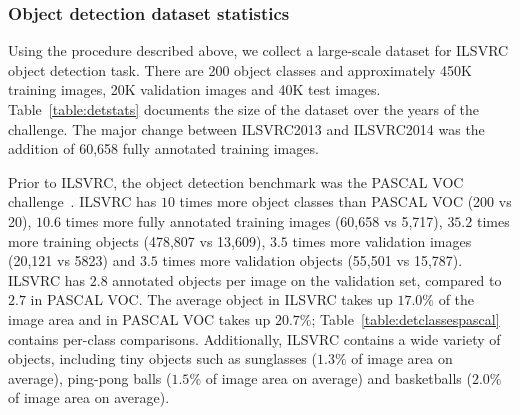 \begin{table}
\begin{algorithm}[t]
 \caption{The algorithm for complete multi-class annotation. This is a special case of the algorithm described in~\citep{Deng14}.
A hierarchy of questions  $\mathcal{G}$ is manually constructed.  All root questions are asked on every image. If the answer to query $q*$ on image $i$ is ``no'' then the answer is assumed to be ``no''  for all queries $q$ such that $q$ is a descendant of $q*$ in the hierarchy. We continue asking the queries until all queries are answered. For images
taken from the single-object localization task we used the known object label to initialize $L$.
}
 \label{algorithm:chi}
\end{algorithm}









\subsubsection{Object detection dataset statistics}
\label{sec:AnnotDetStats}



Using the procedure described above, we collect a large-scale dataset
for ILSVRC object detection task. 
 There are 200 object classes and approximately 450K training images, 20K validation images and 40K test images. Table~\ref{table:detstats} documents the size of the dataset over the years of the challenge. The major change between ILSVRC2013 and ILSVRC2014 was the addition of 60,658 
fully annotated training images.

Prior to ILSVRC, the object detection benchmark was the PASCAL VOC challenge~\citep{PASCALIJCV}. 
ILSVRC has $10$ times more object classes than PASCAL VOC (200 vs 20), $10.6$ times more fully annotated training images (60,658 vs 5,717), $35.2$ times more training objects (478,807 vs 13,609),
$3.5$ times more validation images (20,121 vs 5823) and $3.5$ times more validation objects (55,501 vs 
15,787). ILSVRC has $2.8$ annotated objects per image on the validation set, compared to $2.7$ in PASCAL VOC. The average object in ILSVRC takes up $17.0\%$ of the image area and in PASCAL VOC takes up $20.7\%$; Table~\ref{table:detclassespascal} contains per-class comparisons. Additionally, ILSVRC contains a wide variety of objects, including tiny objects such as sunglasses ($1.3\%$ of image area on average), ping-pong balls ($1.5\%$ of image area on average) and basketballs ($2.0\%$ of image area on average). 


\end{table}
